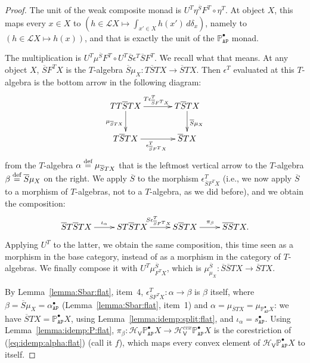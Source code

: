 \documentclass[preprint,12pt]{elsarticle}
\newcommand\eqdef{\mathrel{\buildrel \text{def}\over=}}
\newcommand\Lform{\mathcal L}
\newcommand\Pred{\mathbb{P}}
\newcommand\Angel{{\mathtt{A}}}
\newcommand\Nature{{\mathtt{P}}}
\newcommand\AN{{\Angel\Nature}}
\newcommand\Hoare{{\mathcal H}}
\newcommand\Vt{\mathsf{V}}
\newcommand\HV{\Hoare_\Vt}
\begin{document}
\begin{proof}
  The unit of the weak composite monad is
  $U^T \eta^{\overline S} F^T \circ \eta^T$.  At object $X$, this maps
  every $x \in X$ to
  $(h \in \Lform X \mapsto \int_{x' \in X} h (x') \,d\delta_x)$,
  namely to $(h \in \Lform X \mapsto h (x))$, and that is exactly the
  unit of the $\Pred_\AN^\bullet$ monad.

  The multiplication is
  $U^T \mu^{\overline S} F^T \circ U^T \overline S \epsilon^T
  \overline S F^T$.  We recall what that means.  At any object $X$,
  $\overline S F^T X$ is the $T$-algebra
  $\overline S\mu_X \colon T \overline S T X \to \overline S T X$.
  Then $\epsilon^T$ evaluated at this $T$-algebra is the bottom arrow
  in the following diagram:
  \[
    \xymatrix@C+10pt{
      TT\overline S T X
      \ar[d]_{\mu_{\overline S T X}}
      \ar[r]^{T \epsilon^T_{\overline S F^T X}}
      & T \overline S T X
      \ar[d]^{\overline S \mu_X}
      \\
      T \overline S T X
      \ar[r]_{\epsilon^T_{\overline S F^T X}}
      & \overline S T X
    }
  \]
  from the $T$-algebra $\alpha \eqdef \mu_{\overline S T X}$ that is
  the leftmost vertical arrow to the $T$-algebra
  $\beta \eqdef \overline S \mu_X$ on the right.  We apply $\overline
  S$ to the morphism $\epsilon^T_{\overline S F^T X}$ (i.e., we now
  apply $\overline S$ to a morphism of $T$-algebras, not to a
  $T$-algebra, as we did before), and we obtain the composition:
  \begin{equation}
    \label{eq:mu:part:flat}
    \xymatrix{
      \overline S T \overline S T X
      \ar[r]^{\iota_\alpha}
      &
      S T \overline S T X
      \ar[r]^{S \epsilon^T_{\overline S F^T X}}
      &
      S \overline S T X
      \ar[r]^{\pi_\beta}
      &
      \overline S \overline S T X.
    }
  \end{equation}
  Applying $U^T$ to the latter, we obtain the same composition, this
  time seen as a morphism in the base category, instead of as a
  morphism in the category of $T$-algebras.  We finally compose it
  with $U^T \mu^{\overline S}_{F^T X}$, which is
  $\mu^{\overline S}_{\mu_X} \colon \overline S \overline S T X \to
  \overline S T X$.

  By Lemma~\ref{lemma:Sbar:flat}, item~4,
  $\epsilon^T_{\overline S F^T X} \colon \alpha \to \beta$ is $\beta$
  itself, where $\beta = \overline S \mu_X = \alpha_\AN^\bullet$
  (Lemma~\ref{lemma:Sbar:flat}, item~1) and
  $\alpha = \mu_{\overline S T X} = \mu_{\Pred_\AN^\bullet X}$: we
  have $\overline S T X = \Pred_\AN^\bullet X$, using
  Lemma~\ref{lemma:idemp:split:flat}, and $\iota_\alpha = s_\AN^\bullet$.
  Using Lemma~\ref{lemma:idemp:P:flat},
  $\pi_\beta \colon \HV {\Pred_\AN^\bullet X} \to \HV^{cvx}
  {\Pred_\AN^\bullet X}$ is the corestriction of
  (\ref{eq:idemp:alpha:flat}) (call it $f$), which maps every convex
  element of $\HV {\Pred_\AN^\bullet X}$ to itself.


\end{proof}
\end{document}
